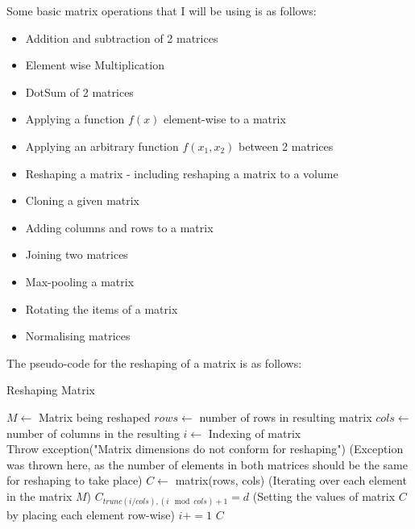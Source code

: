 Some basic matrix operations that I will be using is as follows:
\begin{itemize}
    \item Addition and subtraction of 2 matrices
    \item Element wise Multiplication
    \item DotSum of 2 matrices
    \item Applying a function $f(x)$ element-wise to a matrix
    \item Applying an arbitrary function $f(x_1, x_2)$ between 2 matrices
    \item Reshaping a matrix - including reshaping a matrix to a volume
    \item Cloning a given matrix
    \item Adding columns and rows to a matrix
    \item Joining two matrices
    \item Max-pooling a matrix
    \item Rotating the items of a matrix
    \item Normalising matrices
\end{itemize}

The pseudo-code for the reshaping of a matrix is as follows:

\begin{algorithm}[H]
\caption{Reshaping Matrix}\label{Backpropagation}
\begin{algorithmic}[1]
\State $M \gets$ Matrix being reshaped
\State $rows \gets$ number of rows in resulting matrix
\State $cols \gets$ number of columns in the resulting
\State $i \gets$ Indexing of matrix
\\
\State Throw exception("Matrix dimensions do not conform for reshaping") (Exception was thrown here, as the number of elements in both matrices should be the same for reshaping to take place)
\EndIf
\State $C \gets$ matrix(rows, cols)
 (Iterating over each element in the matrix $M$)
\State $C_{ trunc(i/cols),{(i\mod cols)}+1} = d$ (Setting the values of matrix $C$ by placing each element row-wise)
\State $i+=1$
\EndFor
\Return $C$
\end{algorithmic}
\end{algorithm}

